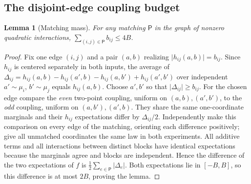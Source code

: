 \documentclass[11pt,letterpaper]{article}
\newtheorem{lemma}[theorem]{Lemma}
\theoremstyle{definition}
\newcommand{\abs}[1]{\lvert #1\rvert}
\begin{document}
\subsection{The disjoint-edge coupling budget}
\begin{lemma}[Matching mass]\label{lem:matching}
For any matching $\mathsf P$ in the graph of nonzero quadratic interactions,
$\sum_{(i,j)\in\mathsf P}b_{ij}\le4B$.
\end{lemma}
\begin{proof}
Fix one edge $(i,j)$ and a pair $(a,b)$ realizing $\abs{h_{ij}(a,b)}=b_{ij}$. Since $h_{ij}$ is centered separately in both inputs, the average of
$\Delta_{ij}=h_{ij}(a,b)-h_{ij}(a',b)-h_{ij}(a,b')+h_{ij}(a',b')$
over independent $a'\sim\mu_i$, $b'\sim\mu_j$ equals $h_{ij}(a,b)$. Choose $a',b'$ so that $\abs{\Delta_{ij}}\ge b_{ij}$.
For the chosen edge compare the \emph{even} two-point coupling, uniform on $(a,b),(a',b')$, to the \emph{odd} coupling, uniform on $(a,b'),(a',b)$. They share the same one-coordinate marginals and their $h_{ij}$ expectations differ by $\Delta_{ij}/2$. Independently make this comparison on every edge of the matching, orienting each difference positively; give all unmatched coordinates the same law in both experiments. All additive terms and all interactions between distinct blocks have identical expectations because the marginals agree and blocks are independent. Hence the difference of the two expectations of $f$ is $\frac12\sum_{e\in\mathsf P}\abs{\Delta_e}$. Both expectations lie in $[-B,B]$, so this difference is at most $2B$, proving the lemma.
\end{proof}
\end{document}

